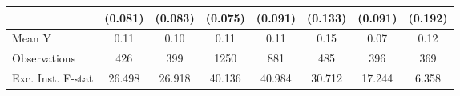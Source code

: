 {\begin{tabular}{l*{7}{c}}
            &     (0.081)         &     (0.083)         &     (0.075)         &     (0.091)         &     (0.133)         &     (0.091)         &     (0.192)         \\
\midrule
Mean Y      &        0.11         &        0.10         &        0.11         &        0.11         &        0.15         &        0.07         &        0.12         \\
Observations&         426         &         399         &        1250         &         881         &         485         &         396         &         369         \\
Exc. Inst. F-stat&      26.498         &      26.918         &      40.136         &      40.984         &      30.712         &      17.244         &       6.358         \\
\bottomrule
\end{tabular}
}
